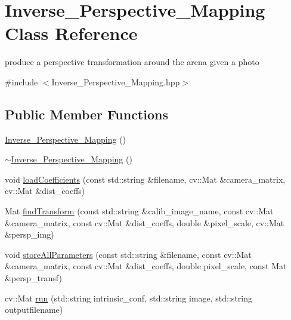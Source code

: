 \hypertarget{class_inverse___perspective___mapping}{}\section{Inverse\+\_\+\+Perspective\+\_\+\+Mapping Class Reference}
\label{class_inverse___perspective___mapping}


produce a perspective transformation around the arena given a photo  




{\ttfamily \#include $<$Inverse\+\_\+\+Perspective\+\_\+\+Mapping.\+hpp$>$}

\subsection*{Public Member Functions}
\begin{DoxyCompactItemize}
\item 
\mbox{\hyperlink{class_inverse___perspective___mapping_a9c3733e22a6516e932a2197196c999f2}{Inverse\+\_\+\+Perspective\+\_\+\+Mapping}} ()
\item 
\mbox{\hyperlink{class_inverse___perspective___mapping_a9f1588ec3a84a4c664ae33c1fd3693df}{$\sim$\+Inverse\+\_\+\+Perspective\+\_\+\+Mapping}} ()
\item 
void \mbox{\hyperlink{class_inverse___perspective___mapping_a60f8dbac68fadb20b085bfbcef293480}{load\+Coefficients}} (const std\+::string \&filename, cv\+::\+Mat \&camera\+\_\+matrix, cv\+::\+Mat \&dist\+\_\+coeffs)
\item 
Mat \mbox{\hyperlink{class_inverse___perspective___mapping_aa4444fc0f5e10cab7f408d6679be73db}{find\+Transform}} (const std\+::string \&calib\+\_\+image\+\_\+name, const cv\+::\+Mat \&camera\+\_\+matrix, const cv\+::\+Mat \&dist\+\_\+coeffs, double \&pixel\+\_\+scale, cv\+::\+Mat \&persp\+\_\+img)
\item 
void \mbox{\hyperlink{class_inverse___perspective___mapping_abdea95329f3868f2a0875832a67f1076}{store\+All\+Parameters}} (const std\+::string \&filename, const cv\+::\+Mat \&camera\+\_\+matrix, const cv\+::\+Mat \&dist\+\_\+coeffs, double pixel\+\_\+scale, const Mat \&persp\+\_\+transf)
\item 
cv\+::\+Mat \mbox{\hyperlink{class_inverse___perspective___mapping_ad95385fefc56350a732760d7c68fe6a3}{run}} (std\+::string intrinsic\+\_\+conf, std\+::string image, std\+::string outputfilename)
\end{DoxyCompactItemize}


